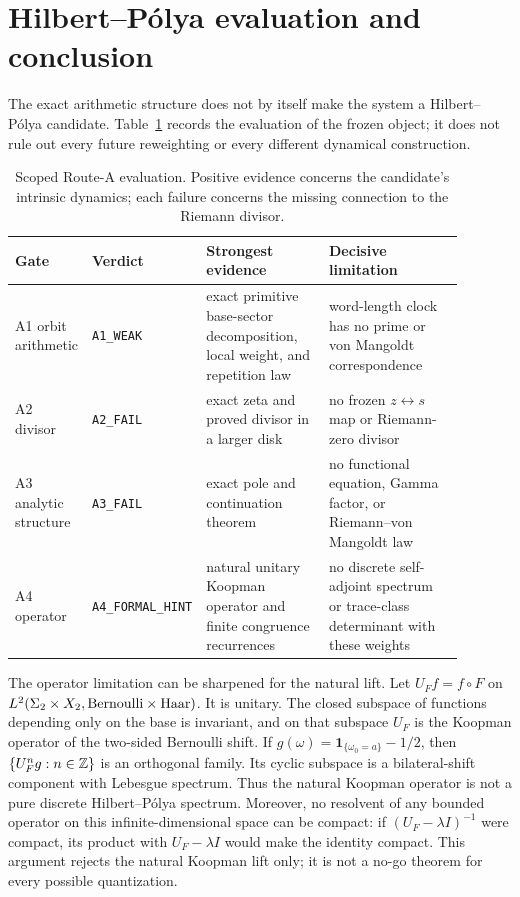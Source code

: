 \section{Hilbert--P\'olya evaluation and conclusion}
\label{sec:route-a}

The exact arithmetic structure does not by itself make the system a
Hilbert--P\'olya candidate.  Table~\ref{tab:route-a} records the evaluation of
the frozen object; it does not rule out every future reweighting or every
different dynamical construction.

\begin{table}[h]
\centering
\small
\caption{Scoped Route-A evaluation.  Positive evidence concerns the
candidate's intrinsic dynamics; each failure concerns the missing connection
to the Riemann divisor.}
\label{tab:route-a}
\begin{tabular}{p{0.13\linewidth}p{0.16\linewidth}p{0.29\linewidth}p{0.31\linewidth}}
\toprule
Gate & Verdict & Strongest evidence & Decisive limitation\\
\midrule
A1 orbit arithmetic & \texttt{A1\_WEAK} & exact primitive base-sector
decomposition, local weight, and repetition law & word-length clock has no
prime or von Mangoldt correspondence\\
A2 divisor & \texttt{A2\_FAIL} & exact zeta and proved divisor in a larger
disk & no frozen \(z\leftrightarrow s\) map or Riemann-zero divisor\\
A3 analytic structure & \texttt{A3\_FAIL} & exact pole and continuation
theorem & no functional equation, Gamma factor, or Riemann--von Mangoldt law\\
A4 operator & \texttt{A4\_FORMAL\_HINT} & natural unitary Koopman operator
and finite congruence recurrences & no discrete self-adjoint spectrum or
trace-class determinant with these weights\\
\bottomrule
\end{tabular}
\end{table}

The operator limitation can be sharpened for the natural lift.  Let
\(U_Ff=f\circ F\) on
\(L^2(\Sigma_2\times X_2,\text{Bernoulli}\times\text{Haar})\).  It is
unitary.  The closed subspace of functions depending only on the base is
invariant, and on that subspace \(U_F\) is the Koopman operator of the
two-sided Bernoulli shift.  If
\(g(\omega)=\mathbf1_{\{\omega_0=a\}}-1/2\), then
\(\{U_F^ng:n\in\mathbb{Z}\}\) is an orthogonal family.  Its cyclic subspace is a
bilateral-shift component with Lebesgue spectrum.  Thus the natural Koopman
operator is not a pure discrete Hilbert--P\'olya spectrum.  Moreover, no
resolvent of any bounded operator on this infinite-dimensional space can be
compact: if \((U_F-\lambda I)^{-1}\) were compact, its product with
\(U_F-\lambda I\) would make the identity compact.  This argument rejects
the natural Koopman lift only; it is not a no-go theorem for every possible
quantization.

